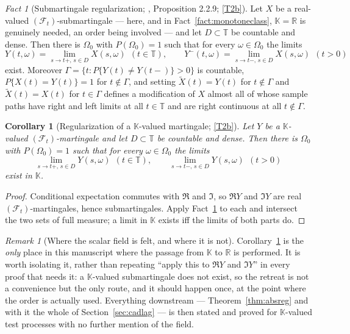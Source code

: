 \documentclass[11pt,a4paper]{article}
\theoremstyle{plain}
\newtheorem{corollary}[theorem]{Corollary}
\theoremstyle{definition}
\theoremstyle{remark}
\newtheorem{remark}[theorem]{Remark}
\newtheorem{fact}[theorem]{Fact}
\newcommand{\R}{\mathbb{R}}
\newcommand{\T}{\mathbb{T}}                     %
\newcommand{\Filt}{\mathcal{F}}
\newcommand{\K}{\mathbb{K}}
\newcommand{\EK}{\cite{EK86}}
\begin{document}
\begin{fact}[Submartingale regularization; \EK, Proposition 2.2.9; \eqref{T2b}]
  \label{fact:submgreg}
  Let $X$ be a real-valued $(\Filt_t)$-submartingale --- here, and in
  Fact~\ref{fact:monotoneclass}, $\K = \R$ is genuinely needed, an order being
  involved --- and let
  $D \subset \T$ be countable and dense.  Then there is $\Omega_0$ with
  $P(\Omega_0) = 1$ such that for every $\omega \in \Omega_0$ the limits
  \begin{equation}
    \label{eq:regY}
    Y(t,\omega) = \lim_{s \to t+,\, s \in D} X(s,\omega) \ \ (t \in \T),
    \qquad
    Y^-(t,\omega) = \lim_{s \to t-,\, s \in D} X(s,\omega) \ \ (t > 0)
  \end{equation}
  exist.  Moreover $\Gamma = \{t : P\{Y(t) \neq Y(t-)\} > 0\}$ is countable,
  $P\{X(t) = Y(t)\} = 1$ for $t \notin \Gamma$, and setting $\tilde{X}(t) = Y(t)$
  for $t \notin \Gamma$ and $\tilde{X}(t) = X(t)$ for $t \in \Gamma$ defines a
  modification of $X$ almost all of whose sample paths have right and left limits
  at all $t \in \T$ and are right continuous at all $t \notin \Gamma$.
\end{fact}

\begin{corollary}[Regularization of a $\K$-valued martingale; \eqref{T2b}]
  \label{cor:regK}
  Let $Y$ be a $\K$-valued $(\Filt_t)$-martingale and let $D \subset \T$ be
  countable and dense.  Then there is $\Omega_0$ with $P(\Omega_0) = 1$ such that
  for every $\omega \in \Omega_0$ the limits
  \[
    \lim_{s \to t+,\, s \in D} Y(s,\omega) \ \ (t \in \T) ,
    \qquad
    \lim_{s \to t-,\, s \in D} Y(s,\omega) \ \ (t > 0)
  \]
  exist in $\K$.
\end{corollary}

\begin{proof}
  Conditional expectation commutes with $\Re$ and $\Im$, so $\Re Y$ and $\Im Y$
  are real $(\Filt_t)$-martingales, hence submartingales.  Apply
  Fact~\ref{fact:submgreg} to each and intersect the two sets of full measure;
  a limit in $\K$ exists iff the limits of both parts do.
\end{proof}

\begin{remark}[Where the scalar field is felt, and where it is not]
  \label{rem:Kretreat}
  Corollary~\ref{cor:regK} is the \emph{only} place in this manuscript where the
  passage from $\K$ to $\R$ is performed.  It is worth isolating it, rather than
  repeating ``apply this to $\Re Y$ and $\Im Y$'' in every proof that needs it:
  a $\K$-valued submartingale does not exist, so the retreat is not a
  convenience but the only route, and it should happen once, at the point where
  the order is actually used.  Everything downstream --- Theorem~\ref{thm:absreg}
  and with it the whole of Section~\ref{sec:cadlag} --- is then stated and proved
  for $\K$-valued test processes with no further mention of the field.
\end{remark}
\end{document}
